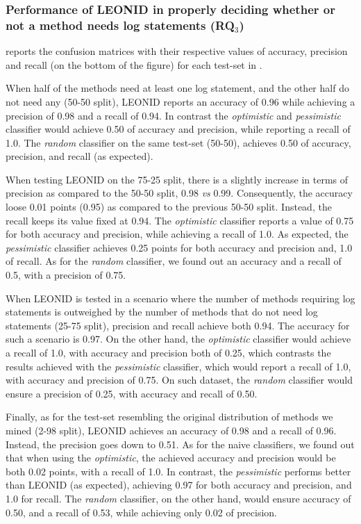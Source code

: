\subsubsection{Performance of LEONID in properly deciding whether or not a \java method needs log statements  (RQ$_{3}$)}
\label{sec:rq3}

 reports the confusion matrices with their respective values of accuracy, precision and recall (on the bottom of the figure) for each test-set in .

When half of the methods need at least one log statement, and the other half do not need any (50-50 split), LEONID reports an accuracy of 0.96 while achieving a precision of 0.98 and a recall of 0.94. In contrast the \textit{optimistic} and \textit{pessimistic} classifier would achieve 0.50 of accuracy and precision, while reporting a recall of 1.0. 
The \textit{random} classifier on the same test-set (50-50), achieves 0.50 of accuracy, precision, and recall (as expected). 

When testing LEONID on the 75-25 split, there is a slightly increase in terms of precision as compared to the 50-50 split, 0.98 \emph{vs} 0.99. Consequently, the accuracy loose 0.01 points (0.95) as compared to the previous 50-50 split. Instead, the recall keeps its value fixed at 0.94.
The \textit{optimistic} classifier reports a value of 0.75 for both accuracy and precision, while achieving a recall of 1.0. As expected, the \textit{pessimistic} classifier achieves 0.25 points for both accuracy and precision and, 1.0 of recall. As for the \textit{random} classifier, we found out an accuracy and a recall of 0.5, with a precision of 0.75.

When LEONID is tested in a scenario where the number of methods requiring log statements is outweighed by the number of methods that do not need log statements (25-75 split), precision and recall achieve both 0.94. The accuracy for such a scenario is 0.97. 
On the other hand, the \textit{optimistic} classifier would achieve a recall of 1.0, with accuracy and precision both of 0.25, which contrasts the results achieved with the \textit{pessimistic} classifier, which would report a recall of 1.0,  with accuracy and precision of 0.75. On such dataset, the \textit{random} classifier would ensure a precision of 0.25, with accuracy and recall of 0.50.

Finally, as for the test-set resembling the original distribution of \java methods we mined (2-98 split), LEONID achieves an accuracy of 0.98 and a recall of 0.96. Instead, the precision goes down to 0.51.
As for the naive classifiers, we found out that when using the \textit{optimistic}, the achieved accuracy and precision would be both 0.02 points, with a recall of 1.0.
In contrast, the \textit{pessimistic} performs better than LEONID (as expected), achieving 0.97 for both accuracy and precision, and 1.0 for recall.
The \textit{random} classifier, on the other hand, would ensure accuracy of 0.50, and a recall of 0.53, while achieving only 0.02 of precision.

